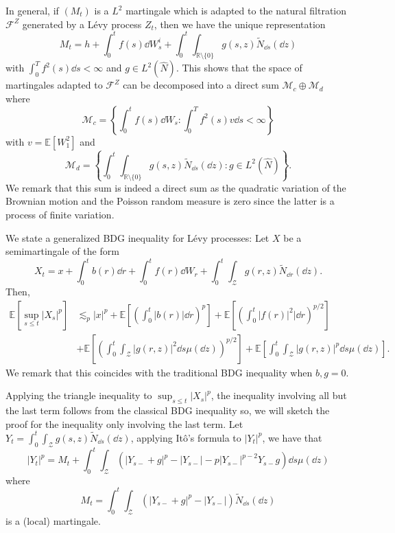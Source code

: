 \documentclass[]{article}
\theoremstyle{definition}
\theoremstyle{definition}
\begin{document}
In general, if \((M_t)\) is a \(L^2\) martingale which is adapted to the natural filtration 
\(\mathcal{F}^Z\) generated by a L\'evy process \(Z_t\), then we have the unique representation
\[M_t = h + \int_0^t f(s) \dd W^i_s + \int_0^t \int_{\mathbb{R} \setminus \{0\}} g(s, z) \tilde N_{\dd s}(\dd z)\]
with \(\int_0^T f^2(s) \dd s < \infty\) and \(g \in L^2(\hat N)\). This shows that the space of 
martingales adapted to \(\mathcal{F}^Z\) can be decomposed into a direct sum \(\mathcal{M}_c \oplus \mathcal{M}_d\)
where 
\[\mathcal{M}_c = \left\{\int_0^t f(s) \dd W_s : \int_0^T f^2(s) v \dd s < \infty \right\}\]
with \(v = \mathbb{E}[W^2_1]\) and
\[\mathcal{M}_d = \left\{\int_0^t \int_{\mathbb{R} \setminus\{0\}} g(s, z) \tilde N_{\dd s}(\dd z) : g \in L^2(\hat N)\right\}.\]
We remark that this sum is indeed a direct sum as the quadratic variation of the Brownian motion and 
the Poisson random measure is zero since the latter is a process of finite variation. 

We state a generalized BDG inequality for L\'evy processes: Let \(X\) be a semimartingale of the form 
\[X_t = x + \int_0^t b(r) \dd r + \int_0^t f(r) \dd W_r + \int_0^t \int_\mathcal{Z} g(r, z) \tilde N_{\dd r}(\dd z).\]
Then,
\begin{align*}
  \mathbb{E}\left[\sup_{s \le t} |X_s|^p\right] & \lesssim_p 
    |x|^p + \mathbb{E}\left[\left(\int_0^t |b(r)| \dd r\right)^p\right] 
    + \mathbb{E}\left[\left(\int_0^t |f(r)|^2| \dd r\right)^{p / 2}\right] \\
    & + \mathbb{E}\left[\left(\int_0^t \int_\mathcal{Z} |g(r, z)|^2 \dd s\mu(\dd z)\right)^{p / 2}\right]
      + \mathbb{E}\left[\int_0^t \int_\mathcal{Z} |g(r, z)|^p \dd s \mu(\dd z)\right].
\end{align*}
We remark that this coincides with the traditional BDG inequality when \(b, g = 0\).

Applying the triangle inequality to \(\sup_{s \le t} |X_s|^p\), the inequality involving all but the last term 
follows from the classical BDG inequality so, we will sketch the proof for the inequality only involving 
the last term. Let \(Y_t = \int_0^t \int_\mathcal{Z} g(s, z) \tilde N_{\dd s}(\dd z)\), applying It\^o's formula 
to \(|Y_t|^p\), we have that 
\begin{equation}\label{eq:ito-normp}
  |Y_t|^p = M_t + \int_0^t \int_\mathcal{Z} \left(|Y_{s-} + g|^p - |Y_{s-}| - p|Y_{s-}|^{p - 2} Y_{s-} g\right) \dd s \mu(\dd z)
\end{equation}
where 
\[M_t = \int_0^t \int_\mathcal{Z} \left(|Y_{s-} + g|^p - |Y_{s-}|\right) \tilde N_{\dd s}(\dd z)\]
is a (local) martingale.
\end{document}
